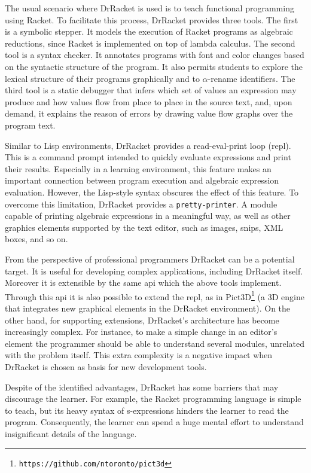 The usual scenario where DrRacket is used is to teach functional programming using Racket. To facilitate this process, DrRacket provides three tools. The first is a symbolic stepper. It models the execution of Racket programs as algebraic reductions, since Racket is implemented on top of lambda calculus. The second tool is a syntax checker. It annotates programs with font and color changes based on the syntactic structure of the program. It also permits students to explore the lexical structure of their programs graphically and to $\alpha$-rename identifiers. The third tool is a static debugger that infers which set of values an expression may produce and how values flow from place to place in the source text, and, upon demand, it explains the reason of errors by drawing value flow graphs over the program text.

Similar to Lisp environments, DrRacket provides a read-eval-print loop (\ac{repl}). This is a command prompt intended to quickly evaluate expressions and print their results. Especially in a learning environment, this feature makes an important connection between program execution and algebraic expression evaluation. However, the Lisp-style syntax obscures the effect of this feature. To overcome this limitation, DrRacket provides a \texttt{pretty-printer}. A module capable of printing algebraic expressions in a meaningful way, as well as other graphics elements supported by the text editor, such as images, snips, XML boxes, and so on.

From the perspective of professional programmers DrRacket can be a potential target. It is useful for developing complex applications, including DrRacket itself. Moreover it is extensible by the same \ac{api} which the above tools implement. Through this \ac{api} it is also possible to extend the \ac{repl}, as in Pict3D\footnote{\texttt{https://github.com/ntoronto/pict3d}} (a 3D engine that integrates new graphical elements in the DrRacket environment). On the other hand, for supporting extensions, DrRacket's architecture has become increasingly complex. For instance, to make a simple change in an editor's element the programmer should be able to understand several modules, unrelated with the problem itself. This extra complexity is a negative impact when DrRacket is chosen as basis for new development tools.

Despite of the identified advantages, DrRacket has some barriers that may discourage the learner. For example, the Racket programming language is simple to teach, but its heavy syntax of s-expressions hinders the learner to read the program. Consequently, the learner can spend a huge mental effort to understand insignificant details of the language.
